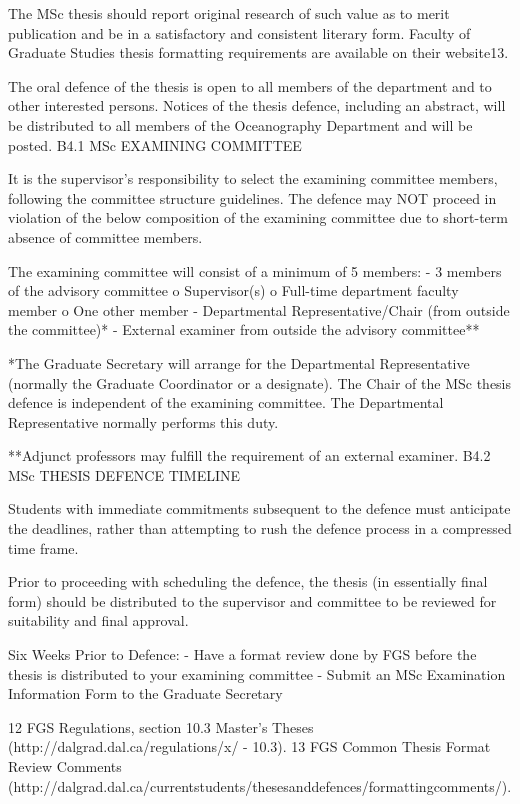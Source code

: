 The MSc thesis should report original research of such value as to merit publication and be in a satisfactory and consistent literary form. Faculty of Graduate Studies thesis formatting requirements are available on their website13.

The oral defence of the thesis is open to all members of the department and to other interested persons. Notices of the thesis defence, including an abstract, will be distributed to all members of the Oceanography Department and will be posted.
B4.1	MSc EXAMINING COMMITTEE

It is the supervisor’s responsibility to select the examining committee members, following the committee structure guidelines. The defence may NOT proceed in violation of the below composition of the examining committee due to short-term absence of committee members.

The examining committee will consist of a minimum of 5 members:
-	3 members of the advisory committee
o	Supervisor(s)
o	Full-time department faculty member
o	One other member
-	Departmental Representative/Chair (from outside the committee)*
-	External examiner from outside the advisory committee**

*The Graduate Secretary will arrange for the Departmental Representative (normally the Graduate Coordinator or a designate). The Chair of the MSc thesis defence is independent of the examining committee. The Departmental Representative normally performs this duty.

**Adjunct professors may fulfill the requirement of an external examiner.
B4.2	MSc THESIS DEFENCE TIMELINE

Students with immediate commitments subsequent to the defence must anticipate the deadlines, rather than attempting to rush the defence process in a compressed time frame.

Prior to proceeding with scheduling the defence, the thesis (in essentially final form) should be distributed to the supervisor and committee to be reviewed for suitability and final approval.

Six Weeks Prior to Defence:
-	Have a format review done by FGS before the thesis is distributed to your examining committee
-	Submit an MSc Examination Information Form to the Graduate Secretary

12 FGS Regulations, section 10.3 Master’s Theses (http://dalgrad.dal.ca/regulations/x/ - 10.3). 13 FGS Common Thesis Format Review Comments (http://dalgrad.dal.ca/currentstudents/thesesanddefences/formattingcomments/).
 

